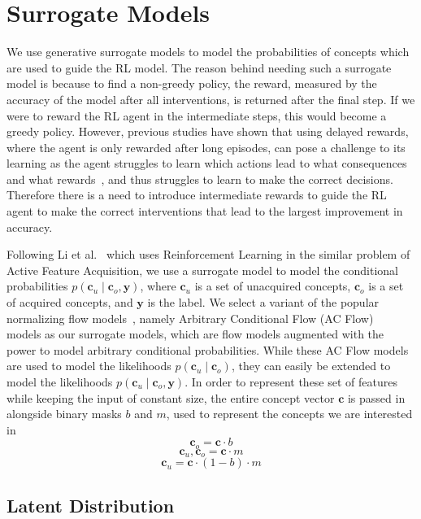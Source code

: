 
\section{Surrogate Models}\label{method:surrogate}

We use generative surrogate models to model the probabilities of concepts which are used
to guide the RL model. 
The reason behind needing such a surrogate model is because
to find a non-greedy policy, the reward, measured by the accuracy
of the model after all interventions, is returned after the final step.
If we were to reward the RL agent in the intermediate steps,
this would become a greedy policy. However, previous studies have shown that
using delayed rewards, where the agent is only rewarded after long episodes,
can pose a challenge to its learning as the agent struggles to learn
which actions lead to what consequences and what
rewards~\cite{temporal-credit-assignment, steps-towards-ai},
and thus struggles to learn to make the correct decisions.
Therefore there is a need to introduce intermediate rewards 
to guide the RL agent to make the correct interventions that lead 
to the largest improvement in accuracy.

Following Li et al.~\cite{afa} which uses Reinforcement 
Learning
in the similar problem of Active Feature Acquisition, we use a surrogate model 
to model
the conditional probabilities $p(\mathbf{c}_u \mid \mathbf{c}_o, \mathbf{y})$, 
where $\mathbf{c}_u$ is a set of unacquired concepts, $\mathbf{c}_o$ is a set of acquired concepts,
and $\mathbf{y}$ is the label. We select a variant of the popular normalizing flow models~\cite{normalizing-flows},
namely Arbitrary Conditional Flow (AC Flow)~\cite{acflow}
models as our surrogate models, 
which are flow models augmented with the power to model arbitrary conditional probabilities.
While these AC Flow models are used to model the likelihoods
$p(\mathbf{c}_u \mid \mathbf{c}_o)$, they can easily be extended to model the 
likelihoods
$p(\mathbf{c}_u \mid \mathbf{c}_o, \mathbf{y})$. In order to represent
these set of features while keeping the input of constant size,
the entire concept vector $\mathbf{c}$ is passed in alongside
binary masks $b$ and $m$, used to represent the concepts we are interested in
\[\mathbf{c}_o = \mathbf{c} \cdot b\]
\[\mathbf{c}_u, \mathbf{c}_o = \mathbf{c} \cdot m\]
\[\mathbf{c}_u = \mathbf{c} \cdot (1 - b) \cdot m\]

\subsection{Latent Distribution}

